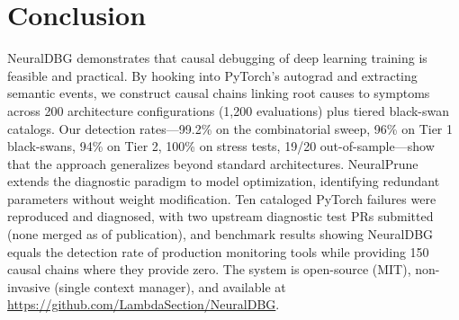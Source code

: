 \documentclass[11pt]{article}
\begin{document}
\section{Conclusion}

NeuralDBG demonstrates that causal debugging of deep learning training is feasible and practical. By hooking into PyTorch's autograd and extracting semantic events, we construct causal chains linking root causes to symptoms across 200 architecture configurations (1,200 evaluations) plus tiered black-swan catalogs. Our detection rates---99.2\% on the combinatorial sweep, 96\% on Tier 1 black-swans, 94\% on Tier 2, 100\% on stress tests, 19/20 out-of-sample---show that the approach generalizes beyond standard architectures. NeuralPrune extends the diagnostic paradigm to model optimization, identifying redundant parameters without weight modification. Ten cataloged PyTorch failures were reproduced and diagnosed, with two upstream diagnostic test PRs submitted (none merged as of publication), and benchmark results showing NeuralDBG equals the detection rate of production monitoring tools while providing 150 causal chains where they provide zero. The system is open-source (MIT), non-invasive (single context manager), and available at \url{https://github.com/LambdaSection/NeuralDBG}.

\end{document}
